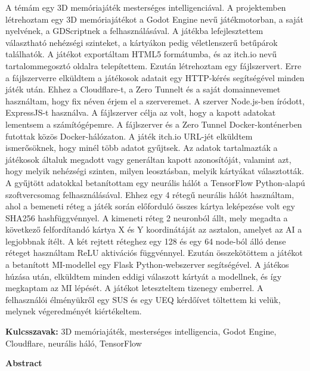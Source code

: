 A témám egy 3D memóriajáték mesterséges intelligenciával.
A projektemben létrehoztam egy 3D memóriajátékot a Godot Engine nevű játékmotorban, a saját nyelvének, a GDScriptnek a felhasználásával. A játékba lefejlesztettem választható nehézségi szinteket, a kártyákon pedig véletlenszerű betűpárok találhatók.
A játékot exportáltam HTML5 formátumba, és az itch.io nevű tartalommegosztó oldalra telepítettem.
Ezután létrehoztam egy fájlszervert. Erre a fájlszerverre elküldtem a játékosok adatait egy HTTP-kérés segítségével minden játék után. Ehhez a Cloudflare-t, a Zero Tunnelt és a saját domainnevemet használtam, hogy fix néven érjem el a szerveremet.
A szerver Node.js-ben íródott, ExpressJS-t használva. A fájlszerver célja az volt, hogy a kapott adatokat lementsem a számítógépemre.
A fájlszerver és a Zero Tunnel Docker-konténerben futottak közös Docker-hálózaton.
A játék itch.io URL-jét elküldtem ismerősöknek, hogy minél több adatot gyűjtsek.
Az adatok tartalmazták a játékosok általuk megadott vagy generáltan kapott azonosítóját, valamint azt, hogy melyik nehézségi szinten, milyen leosztásban, melyik kártyákat választották.
A gyűjtött adatokkal betanítottam egy neurális hálót a TensorFlow Python-alapú szoftvercsomag felhasználásával.
Ehhez egy 4 rétegű neurális hálót használtam, ahol a bemeneti réteg a játék során előforduló összes kártya leképezése volt egy SHA256 hashfüggvénnyel.
A kimeneti réteg 2 neuronból állt, mely megadta  a következő felfordítandó kártya X és Y koordinátáját az asztalon, amelyet az AI a legjobbnak ítélt.
A két rejtett réteghez egy 128 és egy 64 node-ból álló dense réteget használtam ReLU aktivációs függvénnyel.
Ezután összekötöttem a játékot a betanított MI-modellel egy Flask Python-webszerver segítségével. A játékos húzása után, elküldtem minden eddigi válaszott kártyát a modellnek, és így megkaptam az MI lépését.
A játékot leteszteltem tizenegy emberrel. A felhasználói élményükről egy SUS és egy UEQ kérdőívet töltettem ki velük, melynek végeredményét kiértékeltem.
\vspace{8pt}



\textbf{Kulcsszavak: }3D memóriajáték, mesterséges intelligencia, Godot Engine, Cloudflare, neurális háló, TensorFlow
\newpage



\textbf{\large{Abstract}}\\[32pt]

\thispagestyle{fancy}
\pagestyle{fancy}

